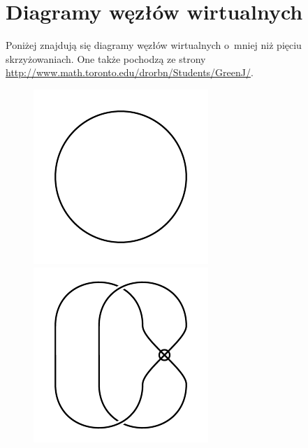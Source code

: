 \section{Diagramy węzłów wirtualnych}
Poniżej znajdują się diagramy węzłów wirtualnych o~mniej niż pięciu skrzyżowaniach.
One także pochodzą ze strony \url{http://www.math.toronto.edu/drorbn/Students/GreenJ/}.

\begin{figure}[H]
\begin{minipage}[b]{.18\linewidth}
\centering
\includegraphics[width=\linewidth]{../data/virtual_0_1.png}
\end{minipage}
\begin{minipage}[b]{.18\linewidth}
\centering
\includegraphics[width=\linewidth]{../data/virtual_2_1.png}

\end{minipage}
\end{figure}
